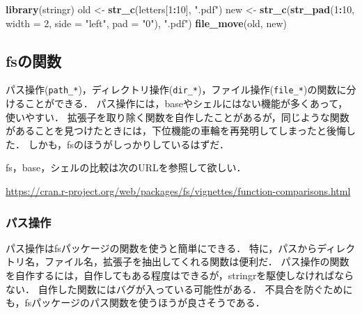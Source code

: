 \documentclass[
]{article}
\newenvironment{Shaded}{\begin{snugshade}}{\end{snugshade}}
\newcommand{\AttributeTok}[1]{\textcolor[rgb]{0.13,0.29,0.53}{#1}}
\newcommand{\DecValTok}[1]{\textcolor[rgb]{0.00,0.00,0.81}{#1}}
\newcommand{\FunctionTok}[1]{\textcolor[rgb]{0.13,0.29,0.53}{\textbf{#1}}}
\newcommand{\NormalTok}[1]{#1}
\newcommand{\OtherTok}[1]{\textcolor[rgb]{0.56,0.35,0.01}{#1}}
\newcommand{\SpecialCharTok}[1]{\textcolor[rgb]{0.81,0.36,0.00}{\textbf{#1}}}
\newcommand{\StringTok}[1]{\textcolor[rgb]{0.31,0.60,0.02}{#1}}
\begin{document}
\begin{Shaded}
\begin{Highlighting}[]
\FunctionTok{library}\NormalTok{(stringr)}
\NormalTok{old }\OtherTok{\textless{}{-}} \FunctionTok{str\_c}\NormalTok{(letters[}\DecValTok{1}\SpecialCharTok{:}\DecValTok{10}\NormalTok{], }\StringTok{".pdf"}\NormalTok{)}
\NormalTok{new }\OtherTok{\textless{}{-}} \FunctionTok{str\_c}\NormalTok{(}\FunctionTok{str\_pad}\NormalTok{(}\DecValTok{1}\SpecialCharTok{:}\DecValTok{10}\NormalTok{, }\AttributeTok{width =} \DecValTok{2}\NormalTok{, }\AttributeTok{side =} \StringTok{"left"}\NormalTok{, }\AttributeTok{pad =} \StringTok{"0"}\NormalTok{), }\StringTok{".pdf"}\NormalTok{)}
\FunctionTok{file\_move}\NormalTok{(old, new)}
\end{Highlighting}
\end{Shaded}

\hypertarget{fsux306eux95a2ux6570}{%
\subsection{fsの関数}\label{fsux306eux95a2ux6570}}

パス操作(\texttt{path\_*})，ディレクトリ操作(\texttt{dir\_*})，ファイル操作(\texttt{file\_*})の関数に分けることができる．
パス操作には，baseやシェルにはない機能が多くあって，使いやすい．
拡張子を取り除く関数を自作したことがあるが，同じような関数があることを見つけたときには，下位機能の車輪を再発明してしまったと後悔した．
しかも，fsのほうがしっかりしているはずだ．

fs，base，シェルの比較は次のURLを参照して欲しい．

\url{https://cran.r-project.org/web/packages/fs/vignettes/function-comparisons.html}

\hypertarget{ux30d1ux30b9ux64cdux4f5c}{%
\subsubsection{パス操作}\label{ux30d1ux30b9ux64cdux4f5c}}

パス操作はfsパッケージの関数を使うと簡単にできる．
特に，パスからディレクトリ名，ファイル名，拡張子を抽出してくれる関数は便利だ．
パス操作の関数を自作するには，自作してもある程度はできるが，stringrを駆使しなければならない．
自作した関数にはバグが入っている可能性がある．
不具合を防ぐためにも，fsパッケージのパス関数を使うほうが良さそうである．
\end{document}
